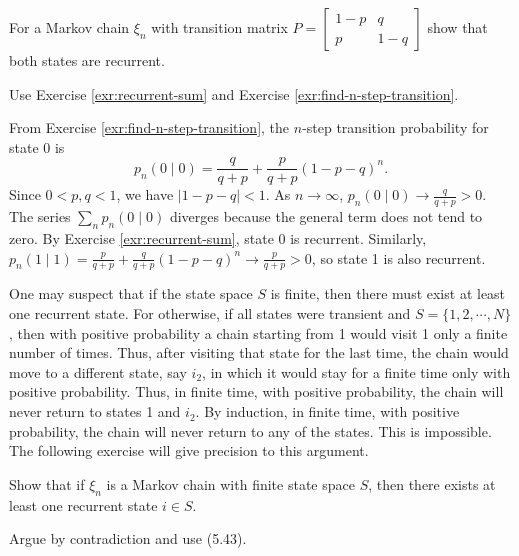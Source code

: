 \begin{Exercise}
\label{exr:two-state-recurrent}
For a Markov chain $\xi_n$ with transition matrix $P = \begin{bmatrix} 1-p & q \\ p & 1-q \end{bmatrix}$ show that both states are recurrent.

\begin{hint}
Use Exercise \ref{exr:recurrent-sum} and Exercise \ref{exr:find-n-step-transition}.
\end{hint}
\end{Exercise}

\begin{Solution}
From Exercise \ref{exr:find-n-step-transition}, the $n$-step transition probability for state 0 is
\[
p_n(0 \mid 0) = \frac{q}{q+p} + \frac{p}{q+p}(1-p-q)^n.
\]
Since $0 < p, q < 1$, we have $|1-p-q| < 1$. As $n \to \infty$, $p_n(0 \mid 0) \to \frac{q}{q+p} > 0$.
The series $\sum_n p_n(0 \mid 0)$ diverges because the general term does not tend to zero.
By Exercise \ref{exr:recurrent-sum}, state 0 is recurrent.
Similarly, $p_n(1 \mid 1) = \frac{p}{q+p} + \frac{q}{q+p}(1-p-q)^n \to \frac{p}{q+p} > 0$, so state 1 is also recurrent.
\end{Solution}

One may suspect that if the state space $S$ is finite, then there must exist at least one recurrent state. For otherwise, if all states were transient and $S = \{1,2,\cdots,N\}$, then with positive probability a chain starting from 1 would visit 1 only a finite number of times. Thus, after visiting that state for the last time, the chain would move to a different state, say $i_2$, in which it would stay for a finite time only with positive probability. Thus, in finite time, with positive probability, the chain will never return to states 1 and $i_2$. By induction, in finite time, with positive probability, the chain will never return to any of the states. This is impossible. The following exercise will give precision to this argument.

\begin{Exercise}
\label{exr:finite-state-recurrent}
Show that if $\xi_n$ is a Markov chain with finite state space $S$, then there exists at least one recurrent state $i\in S$.

\begin{hint}
Argue by contradiction and use (5.43).
\end{hint}
\end{Exercise}

